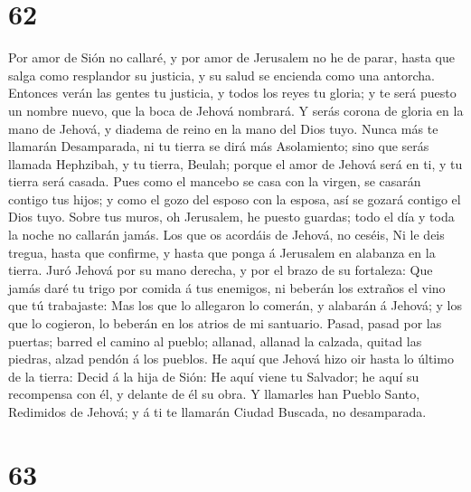 \hypertarget{section-61}{%
\section{62}\label{section-61}}

 Por amor de Sión no callaré, y por amor de Jerusalem no
he de parar, hasta que salga como resplandor su justicia, y su salud se
encienda como una antorcha.  Entonces verán las gentes tu
justicia, y todos los reyes tu gloria; y te será puesto un nombre nuevo,
que la boca de Jehová nombrará.  Y serás corona de gloria
en la mano de Jehová, y diadema de reino en la mano del Dios tuyo.
 Nunca más te llamarán Desamparada, ni tu tierra se dirá
más Asolamiento; sino que serás llamada Hephzibah, y tu tierra, Beulah;
porque el amor de Jehová será en ti, y tu tierra será casada.
 Pues como el mancebo se casa con la virgen, se casarán
contigo tus hijos; y como el gozo del esposo con la esposa, así se
gozará contigo el Dios tuyo.  Sobre tus muros, oh
Jerusalem, he puesto guardas; todo el día y toda la noche no callarán
jamás. Los que os acordáis de Jehová, no ceséis,  Ni le
deis tregua, hasta que confirme, y hasta que ponga á Jerusalem en
alabanza en la tierra.  Juró Jehová por su mano derecha, y
por el brazo de su fortaleza: Que jamás daré tu trigo por comida á tus
enemigos, ni beberán los extraños el vino que tú trabajaste:
 Mas los que lo allegaron lo comerán, y alabarán á Jehová;
y los que lo cogieron, lo beberán en los atrios de mi santuario.
 Pasad, pasad por las puertas; barred el camino al
pueblo; allanad, allanad la calzada, quitad las piedras, alzad pendón á
los pueblos.  He aquí que Jehová hizo oir hasta lo último
de la tierra: Decid á la hija de Sión: He aquí viene tu Salvador; he
aquí su recompensa con él, y delante de él su obra.  Y
llamarles han Pueblo Santo, Redimidos de Jehová; y á ti te llamarán
Ciudad Buscada, no desamparada.

\hypertarget{section-62}{%
\section{63}\label{section-62}}

